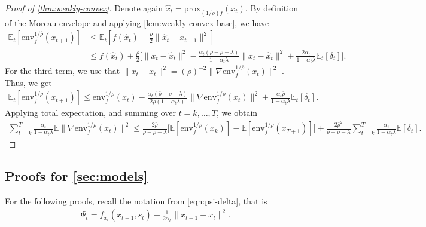 \documentclass{article}
\newcommand{\prox}[1]{\mathrm{prox}_{#1}}
\newcommand{\env}[1]{\mathrm{env}_{#1}}
\newcommand{\E}{\mathbb{E}}
\theoremstyle{plain}
\theoremstyle{definition}
\theoremstyle{remark}
\begin{document}
%
\begin{proof}[Proof of \cref{thm:weakly-convex}]
    Denote again $\hat{x}_t=\prox{(1/\bar{\rho})f}(x_t)$. By definition of the Moreau envelope and applying \cref{lem:weakly-convex-base}, we have
    \begin{align*}
        \E_t[\env{f}^{1/\bar{\rho}}(x_{t+1})] &\leq
        \E_t[f(\hat{x}_t) + \frac{\bar{\rho}}{2}\|\hat{x}_t - x_{t+1}\|^2] \\
        &\leq f(\hat{x}_t) +
        \frac{\bar{\rho}}{2} \Big[\|x_{t} - \hat{x}_t\|^2 - \frac{\alpha_t(\bar{\rho}-\rho-\lambda)}{1-\alpha_t\lambda}\|x_{t} - \hat{x}_t\|^2 + \frac{2\alpha_t}{1-\alpha_t\lambda} \E_t[\delta_t]\Big].
    \end{align*}
For the third term, we use that $\|x_{t} - \hat{x}_t\|^2 = (\bar{\rho})^{-2}\|\nabla \env{f}^{1/\bar{\rho}}(x_t)\|^2$ \citep[Lem.\ 2.2]{Davis2019}. Thus, we get
\begin{align*}
    \E_t[\env{f}^{1/\bar{\rho}}(x_{t+1})] \leq \env{f}^{1/\bar{\rho}}(x_{t})
    - \frac{\alpha_t(\bar{\rho}-\rho-\lambda)}{2\bar{\rho}(1-\alpha_t\lambda)} \|\nabla \env{f}^{1/\bar{\rho}}(x_t)\|^2
    + \frac{\alpha_t\bar{\rho}}{1-\alpha_t\lambda} \E_t[\delta_t].
\end{align*}
Applying total expectation, and summing over $t=k,\ldots,T$, we obtain
\begin{align*}
    \sum_{t=k}^{T} \frac{\alpha_t}{1-\alpha_t\lambda} \E\|\nabla \env{f}^{1/\bar{\rho}}(x_t)\|^2
    \leq \frac{2\bar{\rho}}{\bar{\rho}-\rho-\lambda} \big[\E[\env{f}^{1/\bar{\rho}}(x_{k})] - \E[\env{f}^{1/\bar{\rho}}(x_{T+1})]\big] + \frac{2\bar{\rho}^2}{\bar{\rho}-\rho-\lambda}\sum_{t=k}^{T}\frac{\alpha_t}{1-\alpha_t \lambda} \E[\delta_t].
\end{align*}
\end{proof}


\subsection{Proofs for \cref{sec:models}}\label{sec:app:proofs-deltas}

For the following proofs, recall the notation from \eqref{eqn:psi-delta}, that is
\begin{align*}
\Psi_t=f_{x_t}(x_{t+1},s_t) + \frac{1}{2\alpha_t}\|x_{t+1}-x_t\|^2.
\end{align*}
\end{document}
